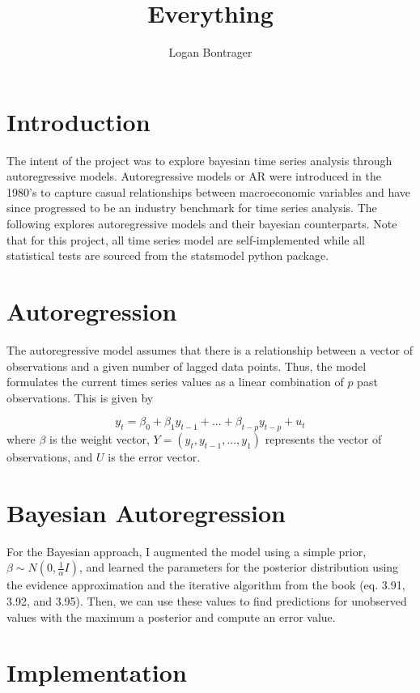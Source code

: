 \documentclass{article}
\begin{document}
\title{Everything}
\author{Logan Bontrager}
\maketitle


\section*{Introduction}

The intent of the project was to explore bayesian time series analysis through autoregressive models. Autoregressive models or AR were introduced in the 1980's to capture casual relationships between macroeconomic variables and have since progressed to be an industry benchmark for time series analysis. The following explores autoregressive models and their bayesian counterparts. Note that for this project, all time series model are self-implemented while all statistical tests are sourced from the statsmodel python package.

\section*{Autoregression}

The autoregressive model assumes that there is a relationship between a vector of observations and a given number of lagged data points. Thus, the model formulates the current times series values as a linear combination of $p$ past observations. This is given by

\[y_t = \beta_0 + \beta_1 y_{t-1} + ... + \beta_{t-p} y_{t-p} + u_t\]
where $\beta$ is the weight vector, $Y = (y_t, y_{t-1}, ..., y_1)$ represents the vector of observations, and $U$ is the error vector.

\section*{Bayesian Autoregression}

For the Bayesian approach, I augmented the model using a simple prior, $\beta \sim N(0, \frac{1}{\alpha}I)$, and learned the parameters for the posterior distribution using the evidence approximation and the iterative algorithm from the book (eq. 3.91, 3.92, and 3.95). Then, we can use these values to find predictions for unobserved values with the maximum a posterior and compute an error value.

\section*{Implementation}
\end{document}
